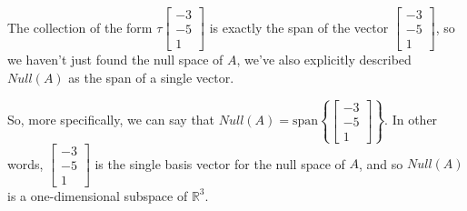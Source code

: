 \documentclass{ximera}
\begin{document}
\begin{remark}

    The collection of the form $\tau \begin{bmatrix} -3 \\ -5 \\ 1 \end{bmatrix}$ is exactly the span of the vector $\begin{bmatrix} -3 \\ -5 \\ 1 \end{bmatrix}$, so we haven't just found the null space of $A$, we've also explicitly described $Null(A)$ as the span of a single vector.

    So, more specifically, we can say that $Null(A)=\text{span}\left\{ \begin{bmatrix} -3 \\ -5 \\ 1 \end{bmatrix} \right\}$. In other words, $\begin{bmatrix} -3 \\ -5 \\ 1 \end{bmatrix}$ is the single basis vector for the null space of $A$, and so $Null(A)$ is a one-dimensional subspace of $\mathbb{R}^3$.

\end{remark}
\end{document}
